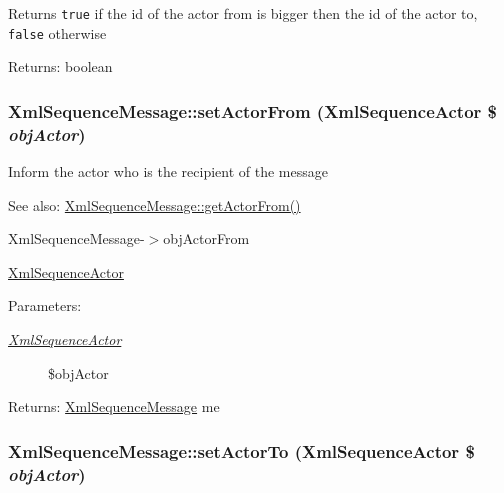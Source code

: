 Returns {\tt true} if the id of the actor from is bigger then the id of the actor to, {\tt false} otherwise

\begin{Desc}
\item[Returns:]boolean \end{Desc}
\hypertarget{class_xml_sequence_message_8dd8205552a1f91a32541187ff799d2f}{
\subsubsection[{setActorFrom}]{\setlength{\rightskip}{0pt plus 5cm}XmlSequenceMessage::setActorFrom ({\bf XmlSequenceActor} \$ {\em objActor})}}
\label{class_xml_sequence_message_8dd8205552a1f91a32541187ff799d2f}


Inform the actor who is the recipient of the message

\begin{Desc}
\item[See also:]\hyperlink{class_xml_sequence_message_d174306473bc3ba17083bd0c2c100443}{XmlSequenceMessage::getActorFrom()} 

XmlSequenceMessage-$>$objActorFrom 

\hyperlink{class_xml_sequence_actor}{XmlSequenceActor} \end{Desc}
\begin{Desc}
\item[Parameters:]
\begin{description}
\item[{\em \hyperlink{class_xml_sequence_actor}{XmlSequenceActor}}]\$objActor \end{description}
\end{Desc}
\begin{Desc}
\item[Returns:]\hyperlink{class_xml_sequence_message}{XmlSequenceMessage} me \end{Desc}
\hypertarget{class_xml_sequence_message_dd5dde3ef38d814ef76f6855b38cebc8}{
\subsubsection[{setActorTo}]{\setlength{\rightskip}{0pt plus 5cm}XmlSequenceMessage::setActorTo ({\bf XmlSequenceActor} \$ {\em objActor})}}
\label{class_xml_sequence_message_dd5dde3ef38d814ef76f6855b38cebc8}


